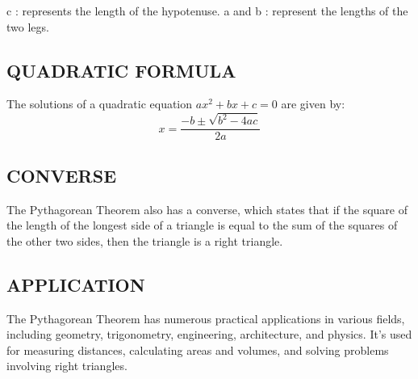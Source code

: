 \documentclass{article}
\begin{document}
c : represents the length of the hypotenuse.\newline
a and b : represent the lengths of the two legs.

\subsection{QUADRATIC FORMULA}
The solutions of a quadratic equation $ax^2 + bx + c = 0$ are given by:
\[
x = \frac{-b \pm \sqrt{b^2 - 4ac}}{2a}
\]

\subsection{CONVERSE}
The Pythagorean Theorem also has a converse, which states that if the square of the length of the longest side of a triangle is equal to the sum of the squares of the other two sides, then the triangle is a right triangle.\newline

\subsection{APPLICATION}
The Pythagorean Theorem has numerous practical applications in various fields, including geometry, trigonometry, engineering, architecture, and physics. It's used for measuring distances, calculating areas and volumes, and solving problems involving right triangles.
\end{document}
